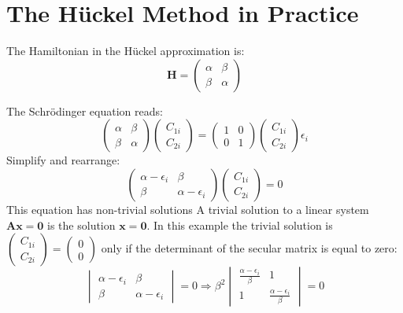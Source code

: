 \documentclass[../Main/chem532-notes.tex]{subfiles}
\begin{document}
\section{The H\"{u}ckel Method in Practice}
\begin{example}[Ethylene]

The Hamiltonian in the H\"{u}ckel approximation is:
\begin{equation}
\mathbf{H} = \begin{pmatrix}
\alpha & \beta \\
\beta & \alpha
\end{pmatrix}
\end{equation}

The Schr\"{o}dinger equation reads:
\begin{equation}
\begin{pmatrix}
\alpha & \beta \\
\beta & \alpha
\end{pmatrix}
\begin{pmatrix}
C_{1i}\\
C_{2i}
\end{pmatrix}
=
\begin{pmatrix}
1 & 0 \\
0 & 1
\end{pmatrix}
\begin{pmatrix}
C_{1i}\\
C_{2i}
\end{pmatrix}
\epsilon_i
\end{equation}
Simplify and rearrange:
\begin{equation}
\begin{pmatrix}
\alpha - \epsilon_i & \beta \\
\beta & \alpha - \epsilon_i
\end{pmatrix}
\begin{pmatrix}
C_{1i}\\
C_{2i}
\end{pmatrix}
= 0
\end{equation}
This equation has non-trivial solutions
A trivial solution to a linear system $\mathbf{A}\mathbf{x} = \mathbf{0}$ is the solution $\mathbf{x} = \mathbf{0}$. In this example the trivial solution is $\begin{pmatrix}
C_{1i}\\
C_{2i}
\end{pmatrix} = 
\begin{pmatrix}
0\\
0
\end{pmatrix}$
only if the determinant of the secular matrix is equal to zero:
\begin{equation}
\begin{vmatrix}
\alpha - \epsilon_i & \beta \\
\beta & \alpha - \epsilon_i
\end{vmatrix}
= 0
\Rightarrow
\beta^2 \begin{vmatrix}
\frac{\alpha - \epsilon_i}{\beta} & 1 \\
1 & \frac{\alpha - \epsilon_i}{\beta}
\end{vmatrix}
= 0
\end{equation}


\end{example}
\end{document}
